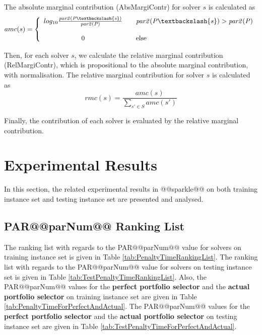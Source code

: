 \documentclass[british]{article}
\begin{document}
The absolute marginal contribution (Abs\textunderscore Margi\textunderscore Contr) for solver $s$ is calculated as 
\begin{equation}
amc(s)=\left\{
\begin{array}{ccl}
log_{10}{\frac{\mathit{par2(P\textbackslash \{s\})}}{\mathit{par2(P)}}} & & \mathit{par2(P\textbackslash \{s\})}> \mathit{par2(P)} \\
& & \\
0 & & \text{else}
\end{array} \right.
\end{equation}


Then, for each solver $s$, we calculate the relative marginal contribution (Rel\textunderscore Margi\textunderscore Contr), which is propositional to the absolute marginal contribution, with normalisation. The relative marginal contribution for solver $s$ is calculated as 
\begin{equation}
\mathit{rmc(s)}=\frac{\mathit{amc(s)}}{\sum_{s' \in S}{amc(s')}}
\end{equation}

Finally, the contribution of each solver is evaluated by the relative marginal contribution.

\section{Experimental Results}
\label{sec:Experimental_Results}

In this section, the related experimental results in @@sparkle@@ on both training instance set and testing instance set are presented and analysed.

\subsection{PAR@@parNum@@ Ranking List}
\label{sec:PAR@@parNum@@_Ranking}

The ranking list with regards to the PAR@@parNum@@ value for solvers on training instance set is given in Table \ref{tab:PenaltyTimeRankingList}. The ranking list with regards to the PAR@@parNum@@ value for solvers on testing instance set is given in Table \ref{tab:TestPenaltyTimeRankingList}. Also, the PAR@@parNum@@ values for the \textbf{perfect portfolio selector} and the \textbf{actual portfolio selector} on training instance set are given in Table \ref{tab:PenaltyTimeForPerfectAndActual}. The PAR@@parNum@@ values for the \textbf{perfect portfolio selector} and the \textbf{actual portfolio selector} on testing instance set are given in Table \ref{tab:TestPenaltyTimeForPerfectAndActual}.
\end{document}
